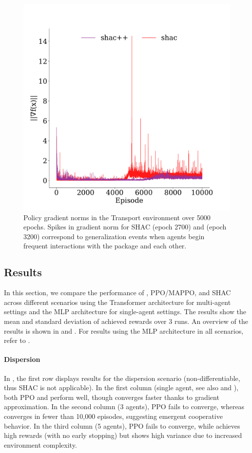 \begin{figure}
    \centering
    \includegraphics[width=0.9\columnwidth]{figs/grads-transformer-transport.pdf}
    \caption{Policy gradient norms in the Transport environment over 5000 epochs. Spikes in gradient norm for SHAC (epoch 2700) and \fname{} (epoch 3200) correspond to generalization events when agents begin frequent interactions with the package and each other.}\label{fig:grads-transformer-transport}
    \vspace{0.5cm}
\end{figure}

\subsection{Results}

In this section, we compare the performance of \fname{}, PPO/MAPPO, and SHAC across different scenarios using the Transformer architecture for multi-agent settings and the MLP architecture for single-agent settings. The results show the mean and standard deviation of achieved rewards over 3 runs. An overview of the results is shown in  and . For results using the MLP architecture in all scenarios, refer to .

\paragraph{Dispersion}
In , the first row displays results for the dispersion scenario (non-differentiable, thus SHAC is not applicable). In the first column (single agent, see also  and ), both PPO and \fname{} perform well, though \fname{} converges faster thanks to gradient approximation. In the second column (3 agents), PPO fails to converge, whereas \fname{} converges in fewer than 10,000 episodes, suggesting emergent cooperative behavior. In the third column (5 agents), PPO fails to converge, while \fname{} achieves high rewards (with no early stopping) but shows high variance due to increased environment complexity.

